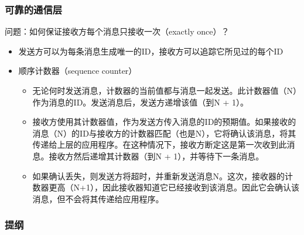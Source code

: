 \begin{frame}[fragile]
    \frametitle{可靠的通信层}
    问题：如何保证接收方每个消息只接收一次（exactly once）？\pause
    \begin{itemize}
        \item 发送方可以为每条消息生成唯一的ID，接收方可以追踪它所见过的每个ID
        \item  顺序计数器（sequence counter）
            \begin{itemize}
            \item 无论何时发送消息，计数器的当前值都与消息一起发送。此计数器值（N）作为消息的ID。发送消息后，发送方递增该值（到N + 1）。
            \item 接收方使用其计数器值，作为发送方传入消息的ID的预期值。如果接收的消息（N）的ID与接收方的计数器匹配（也是N），它将确认该消息，将其传递给上层的应用程序。在这种情况下，接收方断定这是第一次收到此消息。接收方然后递增其计数器（到N + 1），并等待下一条消息。
            \item 如果确认丢失，则发送方将超时，并重新发送消息N。这次，接收器的计数器更高（N+1），因此接收器知道它已经接收到该消息。因此它会确认该消息，但不会将其传递给应用程序。
            \end{itemize}
    \end{itemize}
    
\end{frame}

\begin{frame}
    \frametitle{提纲} %
    \tableofcontents %
    
    
\end{frame}
